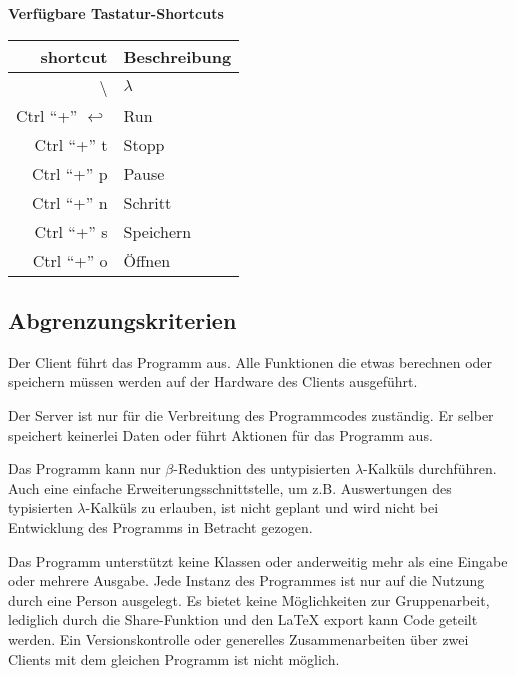 \documentclass[parskip=full,11pt,twoside]{scrartcl}
\begin{document}
\textbf{Verfügbare Tastatur-Shortcuts}

\label{shortcuts}
\begin{tabular}{|r|l|}

    \hline
    shortcut & Beschreibung \\ \hline
    \textbackslash & $\lambda$ \\ \hline
    Ctrl \enquote{+} $\hookleftarrow$ & Run \\ \hline
    Ctrl \enquote{+} t & Stopp \\ \hline
    Ctrl \enquote{+} p & Pause \\ \hline
    Ctrl \enquote{+} n & Schritt \\ \hline
    Ctrl \enquote{+} s & Speichern \\ \hline
    Ctrl \enquote{+} o & Öffnen \\ \hline

\end{tabular}



\subsection{Abgrenzungskriterien}

Der Client führt das Programm aus. Alle Funktionen die etwas berechnen oder speichern müssen werden auf der Hardware des Clients ausgeführt.

Der Server ist nur für die Verbreitung des Programmcodes zuständig. Er selber speichert keinerlei Daten oder führt Aktionen für das Programm aus.

Das Programm kann nur $\beta$-Reduktion des untypisierten $\lambda$-Kalküls durchführen. Auch eine einfache Erweiterungsschnittstelle, um z.B. Auswertungen des typisierten $\lambda$-Kalküls zu erlauben, ist nicht geplant und wird nicht bei Entwicklung des Programms in Betracht gezogen.

Das Programm unterstützt keine Klassen oder anderweitig mehr als eine Eingabe oder mehrere Ausgabe.
Jede Instanz des Programmes ist nur auf die Nutzung durch eine Person ausgelegt. Es bietet keine Möglichkeiten zur Gruppenarbeit, lediglich durch die Share-Funktion und den LaTeX export kann Code geteilt werden.
\newline
Ein Versionskontrolle oder generelles Zusammenarbeiten über zwei Clients mit dem gleichen Programm ist nicht möglich.
\end{document}
